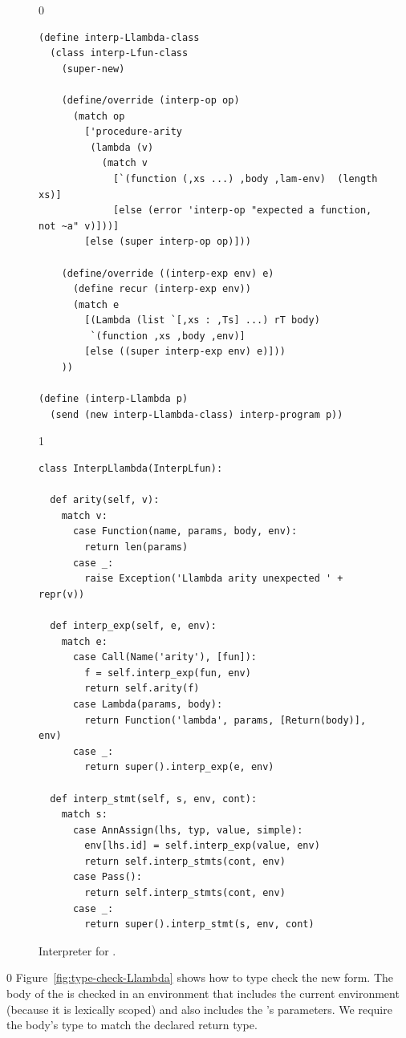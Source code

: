 \documentclass[7x10]{TimesAPriori_MIT}%
\def\racketEd{0}
\def\pythonEd{1}
\def\edition{1}
\newcommand{\pythonColor}[0]{}
\numberwithin{theorem}{chapter}
\numberwithin{definition}{chapter}
\numberwithin{equation}{chapter}
\begin{document}
\begin{figure}[tbp]
  \begin{tcolorbox}[colback=white]
    {\if\edition\racketEd 
\begin{lstlisting}
(define interp-Llambda-class
  (class interp-Lfun-class
    (super-new)

    (define/override (interp-op op)
      (match op
        ['procedure-arity
         (lambda (v)
           (match v
             [`(function (,xs ...) ,body ,lam-env)  (length xs)]
             [else (error 'interp-op "expected a function, not ~a" v)]))]
        [else (super interp-op op)]))

    (define/override ((interp-exp env) e)
      (define recur (interp-exp env))
      (match e
        [(Lambda (list `[,xs : ,Ts] ...) rT body)
         `(function ,xs ,body ,env)]
        [else ((super interp-exp env) e)]))
    ))

(define (interp-Llambda p)
  (send (new interp-Llambda-class) interp-program p))
\end{lstlisting}
\fi}
{\if\edition\pythonEd\pythonColor
\begin{lstlisting}
class InterpLlambda(InterpLfun):

  def arity(self, v):
    match v:
      case Function(name, params, body, env):
        return len(params)
      case _:
        raise Exception('Llambda arity unexpected ' + repr(v))
      
  def interp_exp(self, e, env):
    match e:
      case Call(Name('arity'), [fun]):
        f = self.interp_exp(fun, env)
        return self.arity(f)
      case Lambda(params, body):
        return Function('lambda', params, [Return(body)], env)
      case _:
        return super().interp_exp(e, env)
    
  def interp_stmt(self, s, env, cont):
    match s:
      case AnnAssign(lhs, typ, value, simple):
        env[lhs.id] = self.interp_exp(value, env)
        return self.interp_stmts(cont, env)
      case Pass():
        return self.interp_stmts(cont, env)
      case _:
        return super().interp_stmt(s, env, cont)
\end{lstlisting}
\fi}
  \end{tcolorbox}

  \caption{Interpreter for \LangLam{}.}
\label{fig:interp-Llambda}
\end{figure}


{\if\edition\racketEd
%
Figure~\ref{fig:type-check-Llambda} shows how to type check the new
 form. The body of the  is checked in an
environment that includes the current environment (because it is
lexically scoped) and also includes the 's parameters.  We
require the body's type to match the declared return type.
%
\fi}
\end{document}
